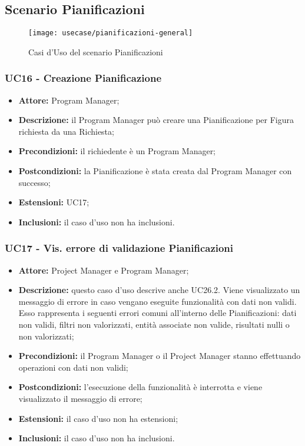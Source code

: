 \subsection{Scenario Pianificazioni}
\begin{figure}[H] 
    \texttt{[image: usecase/pianificazioni-general]} 
    \caption{Casi d'Uso del scenario Pianificazioni}
\end{figure}

\subsubsection*{UC16 - Creazione Pianificazione}
\begin{itemize}[label=$\circ$]
\item \textbf{Attore:} Program Manager;
\item \textbf{Descrizione:} il Program Manager può creare una Pianificazione per Figura richiesta da una Richiesta;
\item \textbf{Precondizioni:} il richiedente è un Program Manager;
\item \textbf{Postcondizioni:} la Pianificazione è stata creata dal Program Manager con successo;
\item \textbf{Estensioni:} UC17;
\item \textbf{Inclusioni:} il caso d'uso non ha inclusioni.
\end{itemize}

\subsubsection*{UC17 - Vis. errore di validazione Pianificazioni}
\begin{itemize}[label=$\circ$]
\item \textbf{Attore:} Project Manager e Program Manager;
\item \textbf{Descrizione:} questo caso d'uso descrive anche UC26.2. Viene visualizzato un messaggio di errore in caso vengano eseguite funzionalità con dati non validi. Esso rappresenta i seguenti errori comuni all'interno delle Pianificazioni: dati non validi, filtri non valorizzati, entità associate non valide, risultati nulli o non valorizzati;
\item \textbf{Precondizioni:} il Program Manager o il Project Manager stanno effettuando operazioni con dati non validi;
\item \textbf{Postcondizioni:} l'esecuzione della funzionalità è interrotta e viene visualizzato il messaggio di errore;
\item \textbf{Estensioni:} il caso d'uso non ha estensioni;
\item \textbf{Inclusioni:} il caso d'uso non ha inclusioni.
\end{itemize}

